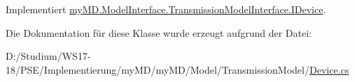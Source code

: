 Implementiert \mbox{\hyperlink{interfacemy_m_d_1_1_model_interface_1_1_transmission_model_interface_1_1_i_device_a2979ec84b80f8ac2efcfc29797e1daa2}{my\+M\+D.\+Model\+Interface.\+Transmission\+Model\+Interface.\+I\+Device}}.



Die Dokumentation für diese Klasse wurde erzeugt aufgrund der Datei\+:\begin{DoxyCompactItemize}
\item 
D\+:/\+Studium/\+W\+S17-\/18/\+P\+S\+E/\+Implementierung/my\+M\+D/my\+M\+D/\+Model/\+Transmission\+Model/\mbox{\hyperlink{_device_8cs}{Device.\+cs}}\end{DoxyCompactItemize}
